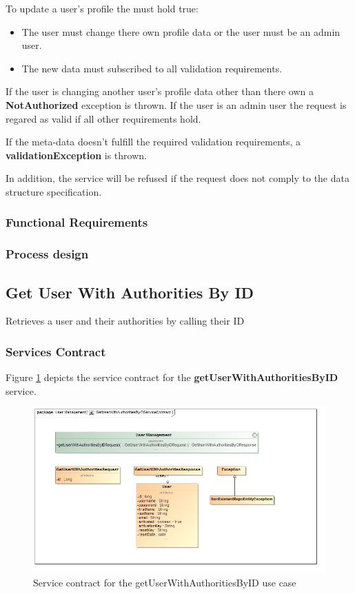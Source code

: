 To update a user's profile the must hold true:
\begin{itemize}
	\item The user must change there own profile data or the user must be an admin user.
	\item The new data must subscribed to all validation requirements.
\end{itemize}

If the user is changing another user's profile data other than there own a \textbf{NotAuthorized} exception is thrown.  If the user is an admin user the request is regared as valid if all other requirements hold.

If the meta-data doesn't fulfill the required validation requirements, a \textbf{validationException} is thrown.

In addition, the service will be refused if the request does not comply to the data structure specification.

\subsubsection{Functional Requirements}

\subsubsection{Process design}

\subsection{Get User With Authorities By ID}
Retrieves a user and their authorities by calling their ID

\subsubsection{Services Contract}
Figure \ref{fig:GetUserWithAuthoritiesByIDServicesContract} depicts the service contract for the \textbf{getUserWithAuthoritiesByID} service.

\begin{figure}[H]
	\begin{center}
		\includegraphics[scale=0.55]{../Diagrams and Charts/Users/Get User With Authorities By ID Service Contract.jpg}
		\caption{Service contract for the getUserWithAuthoritiesByID use case}
		\label{fig:GetUserWithAuthoritiesByIDServicesContract}
	\end{center}
\end{figure}

